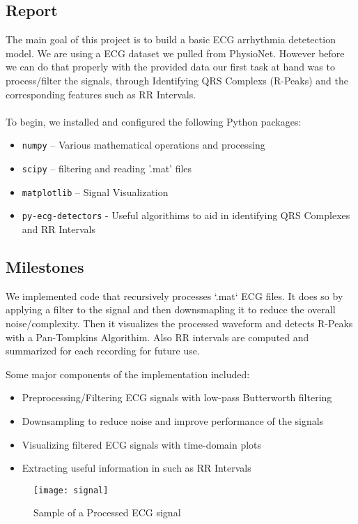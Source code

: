 \subsection{Report}\label{sec:ecg:report}
The main goal of this project is to build a basic ECG arrhythmia detetection model. We are using a ECG dataset we pulled from PhysioNet. However before we can do that properly with the provided data our first task at hand was to process/filter the signals, through Identifying QRS Complexs (R-Peaks) and the corresponding features such as RR Intervals.
\\
\\
To begin, we installed and configured the following Python packages:
\begin{itemize}
    \item \texttt{numpy} – Various mathematical operations and processing
    \item \texttt{scipy} – filtering and reading '.mat' files
    \item \texttt{matplotlib} – Signal Visualization
    \item \texttt{py-ecg-detectors}  - Useful algorithims to aid in identifying QRS Complexes and RR Intervals
\end{itemize}

\subsection{Milestones}\label{sec:ecg:milestones}
We implemented code that recursively processes `.mat` ECG files. It does so by applying a filter to the signal and then downsmapling it to reduce the overall noise/complexity. Then it visualizes the processed waveform and detects R-Peaks with a Pan-Tompkins Algorithim. Also RR intervals are computed and summarized for each recording for future use.

Some major components of the implementation included:
\begin{itemize}
    \item Preprocessing/Filtering ECG signals with low-pass Butterworth filtering
    \item Downsampling to reduce noise and improve performance of the signals
    \item Visualizing filtered ECG signals with time-domain plots
    \item Extracting useful information in such as RR Intervals
\end{itemize}

\begin{figure}
	\centering
	\texttt{[image: signal]}
	\caption{Sample of a Processed ECG signal}
	\label{fig:Signal}
\end{figure}

